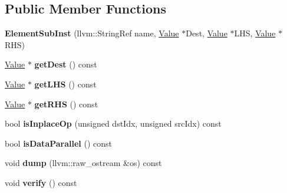 \subsection*{Public Member Functions}
\begin{DoxyCompactItemize}
\item 
\mbox{\label{classglow_1_1_element_sub_inst_a72e41a027393e6f7d2c84983b980cfbb}} 
{\bfseries Element\+Sub\+Inst} (llvm\+::\+String\+Ref name, \hyperlink{classglow_1_1_value}{Value} $\ast$Dest, \hyperlink{classglow_1_1_value}{Value} $\ast$L\+HS, \hyperlink{classglow_1_1_value}{Value} $\ast$R\+HS)
\item 
\mbox{\label{classglow_1_1_element_sub_inst_afbe2ee7fbe8852d8d688d6eec53dcb0b}} 
\hyperlink{classglow_1_1_value}{Value} $\ast$ {\bfseries get\+Dest} () const
\item 
\mbox{\label{classglow_1_1_element_sub_inst_a8572082d7b2a3d8d396fc0bfb5cb1b2d}} 
\hyperlink{classglow_1_1_value}{Value} $\ast$ {\bfseries get\+L\+HS} () const
\item 
\mbox{\label{classglow_1_1_element_sub_inst_a5086eae71852d77880391006939a8e92}} 
\hyperlink{classglow_1_1_value}{Value} $\ast$ {\bfseries get\+R\+HS} () const
\item 
\mbox{\label{classglow_1_1_element_sub_inst_a4a633e206ee901d3eea320e5e0dd68aa}} 
bool {\bfseries is\+Inplace\+Op} (unsigned dst\+Idx, unsigned src\+Idx) const
\item 
\mbox{\label{classglow_1_1_element_sub_inst_a8d03569658dcba1767bb1a3369b5a578}} 
bool {\bfseries is\+Data\+Parallel} () const
\item 
\mbox{\label{classglow_1_1_element_sub_inst_a03bc22a15e6ea912e1feafad8e9e020d}} 
void {\bfseries dump} (llvm\+::raw\+\_\+ostream \&os) const
\item 
\mbox{\label{classglow_1_1_element_sub_inst_a76d8c9c4fff46d7f018ef7f4da1613bb}} 
void {\bfseries verify} () const
\end{DoxyCompactItemize}
